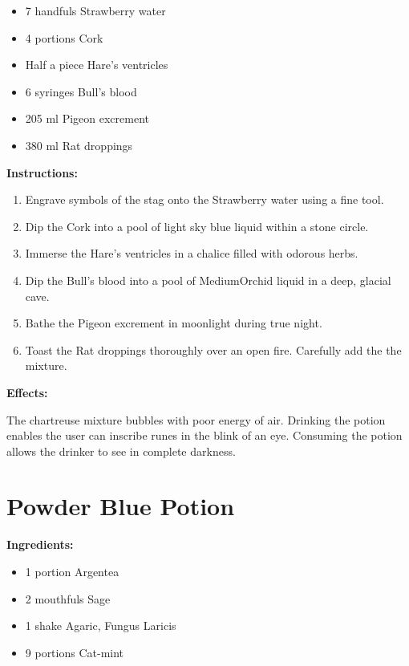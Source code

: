\documentclass{article}
\begin{document}
\begin{itemize}
  \item 7 handfuls Strawberry water
  \item 4 portions Cork
  \item Half a piece Hare's ventricles
  \item 6 syringes Bull's blood
  \item 205 ml Pigeon excrement
  \item 380 ml Rat droppings
\end{itemize}

\textbf{Instructions:}

\begin{enumerate}
  \item Engrave symbols of the stag onto the Strawberry water using a fine tool.
  \item Dip the Cork into a pool of light sky blue liquid within a stone circle.
  \item Immerse the Hare's ventricles in a chalice filled with odorous herbs.
  \item Dip the Bull's blood into a pool of MediumOrchid liquid in a deep, glacial cave.
  \item Bathe the Pigeon excrement in moonlight during true night.
  \item Toast the Rat droppings thoroughly over an open fire. Carefully add the the mixture.
\end{enumerate}

\textbf{Effects:}

The chartreuse mixture bubbles with poor energy of air. Drinking the potion enables the user can inscribe runes in the blink of an eye. Consuming the potion allows the drinker to see in complete darkness.

\newpage
\section*{Powder Blue Potion}

\textbf{Ingredients:}

\begin{itemize}
  \item 1 portion Argentea
  \item 2 mouthfuls Sage
  \item 1 shake Agaric, Fungus Laricis
  \item 9 portions Cat-mint
\end{itemize}
\end{document}
